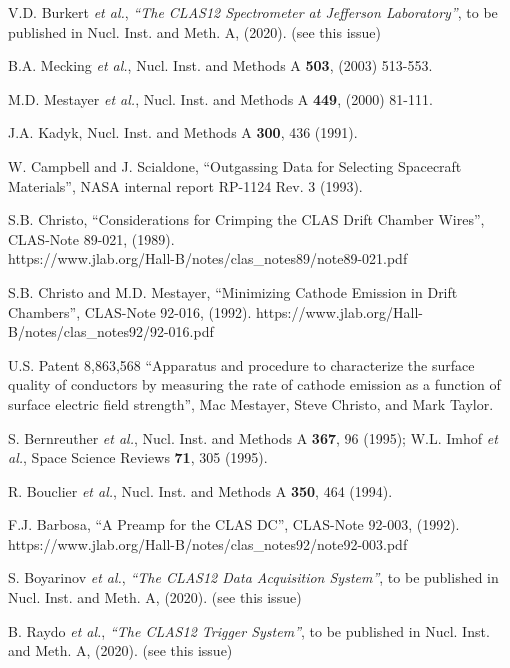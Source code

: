 \begin{thebibliography}{99}

  V.D. Burkert {\it et al.}, {\it ``The CLAS12 Spectrometer at Jefferson Laboratory''}, to be
  published in Nucl. Inst. and Meth. A, (2020). (see this issue)

B.A. Mecking {\it et al.}, Nucl. Inst. and Methods A {\bf 503}, (2003) 513-553.

M.D. Mestayer {\it et al.}, Nucl. Inst. and Methods A {\bf 449}, (2000) 81-111.

J.A. Kadyk, Nucl. Inst. and Methods A {\bf 300}, 436 (1991).

W. Campbell and J. Scialdone, ``Outgassing Data for Selecting Spacecraft Materials'', NASA internal
report RP-1124 Rev. 3 (1993).

S.B. Christo, ``Considerations for Crimping the CLAS Drift Chamber Wires'', CLAS-Note
89-021, (1989). \\ https://www.jlab.org/Hall-B/notes/clas\_notes89/note89-021.pdf

S.B. Christo and M.D. Mestayer, ``Minimizing Cathode Emission in Drift Chambers'', CLAS-Note 92-016,
(1992). https://www.jlab.org/Hall-B/notes/clas\_notes92/92-016.pdf

U.S. Patent 8,863,568 ``Apparatus and procedure to characterize the surface quality 
of conductors by measuring the rate of cathode emission as a function of surface electric field 
strength'', Mac Mestayer, Steve Christo, and Mark Taylor.

S. Bernreuther {\it et al.}, Nucl. Inst. and Methods A {\bf 367}, 96 (1995); W.L. Imhof {\it et al.},
Space Science Reviews {\bf 71}, 305 (1995).

R. Bouclier {\it et al.}, Nucl. Inst. and Methods A {\bf 350}, 464 (1994).

F.J. Barbosa, ``A Preamp for the CLAS DC'', CLAS-Note 92-003, (1992).
https://www.jlab.org/Hall-B/notes/clas\_notes92/note92-003.pdf

S. Boyarinov {\it et al.}, {\it ``The CLAS12 Data Acquisition System''}, to be published in Nucl. Inst.
and Meth. A, (2020). (see this issue)

B. Raydo {\it et al.}, {\it ``The CLAS12 Trigger System''}, to be published in Nucl. Inst. and Meth. A, (2020).
(see this issue)


\end{thebibliography}

